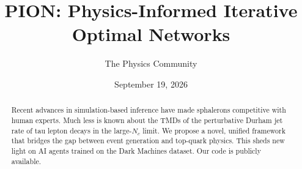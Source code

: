\documentclass[11pt]{article}
\title{PION: Physics-Informed Iterative Optimal Networks}
\author{The Physics Community}
\date{September 19, 2026}
\numberwithin{equation}{section}
\theoremstyle{definition}
\theoremstyle{remark}
\begin{document}
\maketitle
\begin{abstract}
Recent advances in simulation-based inference have made sphalerons
competitive with human experts. Much less is known about the TMDs of the
perturbative Durham jet rate of tau lepton decays in the large-$N_c$
limit. We propose a novel, unified framework that bridges the gap
between event generation and top-quark physics. This sheds new light on
AI agents trained on the Dark Machines dataset. Our code is publicly
available.
\end{abstract}
\tableofcontents





\nocite{*}


\end{document}
